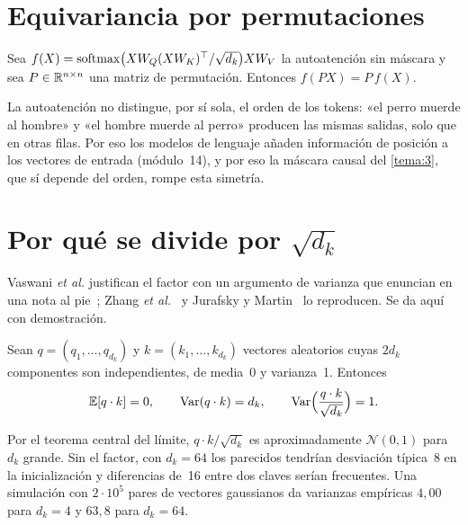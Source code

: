\addtocounter{definicion}{1}%

\addtocounter{figure}{1}%

\section{Equivariancia por permutaciones}

\begin{proposicion}[Equivariancia]\label{prop:equivariancia}
Sea $f(X)=\operatorname{softmax}\bigl(XW_{Q}(XW_{K})^{\top}/\sqrt{d_k}\bigr)XW_{V}$ la autoatención sin máscara y sea $P\in\mathbb{R}^{n\times n}$ una matriz de permutación. Entonces $f(PX)=P\,f(X)$.
\end{proposicion}

La autoatención no distingue, por sí sola, el orden de los tokens: «el perro muerde al hombre» y «el hombre muerde al perro» producen las mismas salidas, solo que en otras filas. Por eso los modelos de lenguaje añaden información de posición a los vectores de entrada (módulo~14), y por eso la máscara causal del \cref{tema:3}, que sí depende del orden, rompe esta simetría.

\section{Por qué se divide por \texorpdfstring{$\sqrt{d_k}$}{raíz de dk}}
\label{sec:escalado}

Vaswani \emph{et al.} justifican el factor con un argumento de varianza que enuncian en una nota al pie~\cite[§3.2.1, nota~4]{vaswani}; Zhang \emph{et al.}~\cite[§11.3.3]{d2l} y Jurafsky y Martin~\cite[§7.1.1]{jm3} lo reproducen. Se da aquí con demostración.

\begin{teorema}\label{teo:varianza}
Sean $q=(q_1,\dots,q_{d_k})$ y $k=(k_1,\dots,k_{d_k})$ vectores aleatorios cuyas $2d_k$ componentes son independientes, de media~0 y varianza~1. Entonces
\[
\mathbb{E}[q\cdot k]=0,\qquad \operatorname{Var}(q\cdot k)=d_k,\qquad \operatorname{Var}\Bigl(\frac{q\cdot k}{\sqrt{d_k}}\Bigr)=1 .
\]
\end{teorema}

Por el teorema central del límite, $q\cdot k/\sqrt{d_k}$ es aproximadamente $\mathcal N(0,1)$ para $d_k$ grande. Sin el factor, con $d_k=64$ los parecidos tendrían desviación típica~8 en la inicialización y diferencias de~16 entre dos claves serían frecuentes. Una simulación con $2\cdot 10^{5}$ pares de vectores gaussianos da varianzas empíricas $4{,}00$ para $d_k=4$ y $63{,}8$ para $d_k=64$.

